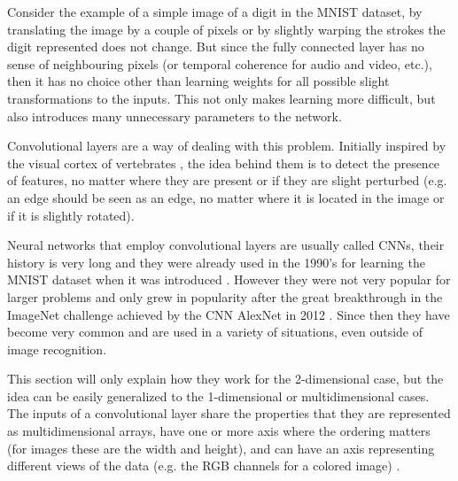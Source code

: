 Consider the example of a simple image of a digit in the \gls{MNIST} dataset, by translating the image by a couple of pixels or by slightly warping the strokes the digit represented does not change. But since the fully connected layer has no sense of neighbouring pixels (or temporal coherence for audio and video, etc.), then it has no choice other than learning weights for all possible slight transformations to the inputs. This not only makes learning more difficult, but also introduces many unnecessary parameters to the network.

Convolutional layers are a way of dealing with this problem. Initially inspired by the visual cortex of vertebrates \cite{neurocognitron1982}, the idea behind them is to detect the presence of features, no matter where they are present or if they are slight perturbed (e.g. an edge should be seen as an edge, no matter where it is located in the image or if it is slightly rotated).

Neural networks that employ convolutional layers are usually called \acp{CNN}, their history is very long and they were already used in the 1990's for learning the \gls{MNIST} dataset when it was introduced \cite{mnist1998}. However they were not very popular for larger problems and only grew in popularity after the great breakthrough in the ImageNet challenge achieved by the \gls{CNN} AlexNet in 2012 \cite{alexnet2012}. Since then they have become very common and are used in a variety of situations, even outside of image recognition. 

This section will only explain how they work for the 2-dimensional case, but the idea can be easily generalized to the 1-dimensional or multidimensional cases. The inputs of a convolutional layer share the properties that they are represented as multidimensional arrays, have one or more axis where the ordering matters (for images these are the width and height), and can have an axis representing different views of the data (e.g. the RGB channels for a colored image) \cite{guide_conv2018}.

